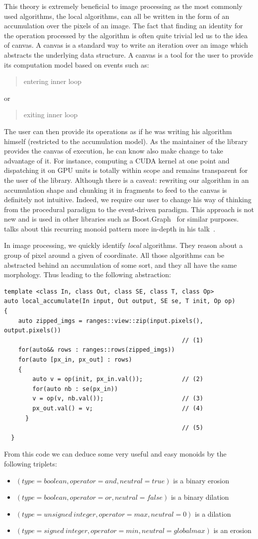 This theory is extremely beneficial to image processing as the most commonly used algorithms, the local algorithms, can
all be written in the form of an accumulation over the pixels of an image. The fact that finding an identity for the
operation processed by the algorithm is often quite trivial led us to the idea of canvas. A canvas is a standard way to
write an iteration over an image which abstracts the underlying data structure. A canvas is a tool for the user to
provide its computation model based on events such as: \blockquote{entering inner loop} or \blockquote{exiting inner
  loop}. The user can then provide its operations as if he was writing his algorithm himself (restricted to the
accumulation model). As the maintainer of the library provides the canvas of execution, he can know also make change to
take advantage of it. For instance, computing a CUDA kernel at one point and dispatching it on GPU units is totally
within scope and remains transparent for the user of the library. Although there is a caveat: rewriting our algorithm in
an accumulation shape and chunking it in fragments to feed to the canvas is definitely not intuitive. Indeed, we require
our user to change his way of thinking from the procedural paradigm to the event-driven paradigm. This approach is not
new and is used in other libraries such as Boost.Graph~\parencite{siek.2001.boostgraph} for similar purposes.
\citeauthor{dean.2019.monoids} talks about this recurring monoid pattern more in-depth in his
talk~\parencite{dean.2019.monoids}.

In image processing, we quickly identify \emph{local} algorithms. They reason about a group of pixel around a given of
coordinate. All those algorithms can be abstracted behind an accumulation of some sort, and they all have the same
morphology. Thus leading to the following abstraction:
\begin{verbatim}
template <class In, class Out, class SE, class T, class Op>
auto local_accumulate(In input, Out output, SE se, T init, Op op)
{
    auto zipped_imgs = ranges::view::zip(input.pixels(), output.pixels())
                                                  // (1)
    for(auto&& rows : ranges::rows(zipped_imgs))
    for(auto [px_in, px_out] : rows)
    {
        auto v = op(init, px_in.val());           // (2)
        for(auto nb : se(px_in))
        v = op(v, nb.val());                      // (3)
        px_out.val() = v;                         // (4)
      }
                                                  // (5)
  }
\end{verbatim}
From this code we can deduce some very useful and easy monoids by the following triplets:
\begin{itemize}
  \item \((type = boolean, operator = and, neutral = true)\) is a binary erosion
  \item \((type = boolean, operator = or, neutral = false)\) is a binary dilation
  \item \((type = unsigned\ integer, operator = max, neutral = 0)\) is a dilation
  \item \((type = signed\ integer, operator = min, neutral = global max)\) is an erosion
\end{itemize}


